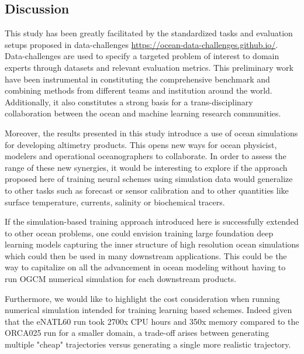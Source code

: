 \begin{bibunit}
\section{Discussion}
\label{sec:discussion}
This study has been greatly facilitated by the standardized tasks and evaluation setups proposed in data-challenges \url{https://ocean-data-challenges.github.io/}. Data-challenges are used to specify a targeted problem of interest to domain experts through datasets and relevant evaluation metrics. This preliminary work have been instrumental in constituting the comprehensive benchmark and combining methods from different teams and institution around the world. Additionally, it also constitutes a strong basis for a trans-disciplinary collaboration between the ocean and machine learning research communities.

Moreover, the results presented in this study introduce a use of ocean simulations for developing altimetry products. This opens new ways for ocean physicist, modelers and operational oceanographers to collaborate. In order to assess the range of these new synergies, it would be interesting to explore if the approach proposed here of training neural schemes using simulation data would generalize to other tasks such as forecast or sensor calibration and to other quantities like surface temperature, currents, salinity or biochemical tracers.

If the simulation-based training approach introduced here is successfully extended to other ocean problems, one could envision training large foundation deep learning models \cite{brownLanguageModelsAre} capturing the inner structure of high resolution ocean simulations which could then be used in many downstream applications. This could be the way to capitalize on all the advancement in ocean modeling without having to run OGCM numerical simulation for each downstream products.    

Furthermore, we would like to highlight the cost consideration when running numerical simulation intended for training learning based schemes. Indeed given that the eNATL60 run took 2700x CPU hours and 350x memory compared to the ORCA025 run for a smaller domain, a trade-off arises between generating multiple "cheap" trajectories versus generating a single more realistic trajectory. 


\end{bibunit}
